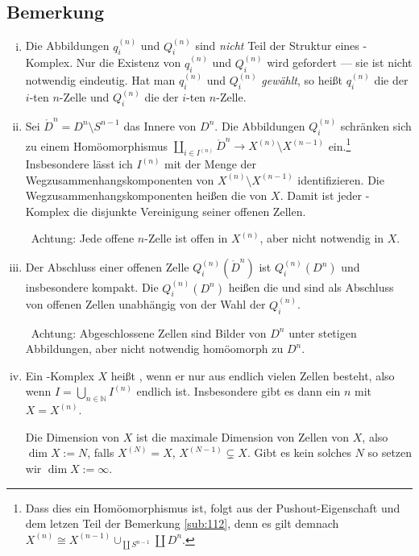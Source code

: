 \subsection[Bemerkungen zur Definition von \CW-Komplexen]{Bemerkung} %
\label{sub:114}
\begin{enumerate}[(i)]
	\item Die Abbildungen $q_i^{(n)}$ und $Q_i^{(n)}$ sind \emph{nicht} Teil der Struktur eines \CW-Komplex. Nur die Existenz von $q_i^{(n)}$ und $Q_i^{(n)}$ wird 
	gefordert --- sie ist nicht notwendig eindeutig. Hat man $q_i^{(n)}$ und $Q_i^{(n)}$ \emph{gewählt}, so heißt $q_i^{(n)}$ die  der $i$-ten
	$n$-Zelle und $Q_i^{(n)}$ die  der $i$-ten $n$-Zelle.
	\item Sei $\mathring{D}^n = D^n \setminus S^{n-1}$ das Innere von $D^n$. Die Abbildungen $Q_i^{(n)}$ schränken sich zu einem Homöomorphismus 
	$\coprod_{i \in I^{(n)}} \mathring{D}^n \to X^{(n)} \setminus X^{(n-1)}$ ein.\footnote{Dass dies ein Homöomorphismus ist, folgt 
	aus der Pushout-Eigenschaft und dem letzen Teil der Bemerkung \ref{sub:112}, denn es gilt demnach 
	$X^{(n)}\cong X^{(n-1)}\cup_{\coprod S^{n-1}} \coprod D^n$.} 
	Insbesondere lässt ich $I^{(n)}$ mit der Menge der Wegzusammenhangskomponenten von 
	$X^{(n)} \setminus X^{(n-1)}$ identifizieren. Die Wegzusammenhangskomponenten heißen die  von $X$. Damit ist jeder \CW-Komplex 
	die disjunkte Vereinigung seiner offenen Zellen.
	
	\ifxetexorluatex \faWarningSign \, \fi Achtung: Jede offene $n$-Zelle ist offen in $X^{(n)}$, aber nicht notwendig in $X$.
	\item Der Abschluss einer offenen Zelle $Q_i^{(n)}(\mathring{D}^n)$ ist $Q_i^{(n)}(D^n)$ und insbesondere kompakt. Die $Q_i^{(n)}(D^n)$ heißen die
	 und sind als Abschluss von offenen Zellen unabhängig von der Wahl der $Q_i^{(n)}$.
	
	\ifxetexorluatex \faWarningSign \, \fi Achtung: Abgeschlossene Zellen sind Bilder von $D^n$ unter stetigen Abbildungen, aber nicht notwendig homöomorph zu $D^n$.
	\item Ein \CW-Komplex $X$ heißt , wenn er nur aus endlich vielen Zellen besteht, also wenn 
	$I = \bigcup_{n \in \mathds{N} } I^{(n)}$ endlich ist. Insbesondere gibt es dann ein $n$ mit $X=X^{(n)}$.
	
	Die Dimension von $X$ ist die maximale Dimension von Zellen von $X$, also $\dim X := N$, falls $X^{(N)}=X$, $X^{(N-1)} \subsetneq X$. Gibt es kein solches $N$ so 
	setzen wir $\dim X := \infty$.
\end{enumerate}

